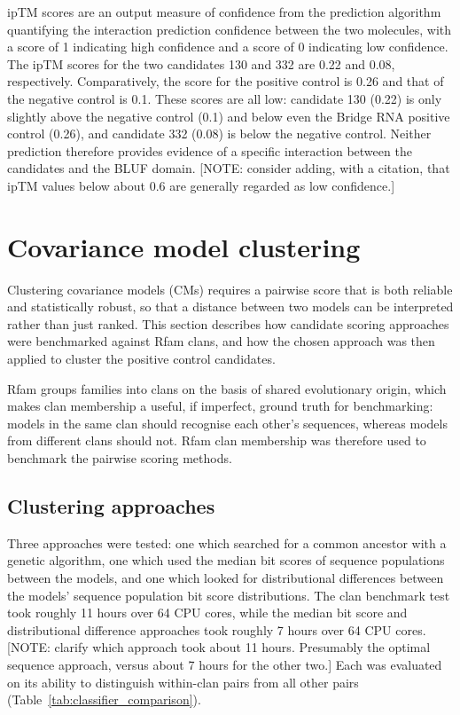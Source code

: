 \ac{ipTM} scores are an output measure of confidence from the prediction algorithm quantifying the interaction prediction confidence between the two molecules, with a score of 1 indicating high confidence and a score of 0 indicating low confidence.
The \ac{ipTM} scores for the two candidates 130 and 332 are 0.22 and 0.08, respectively.
Comparatively, the score for the positive control is 0.26 and that of the negative control is 0.1.
These scores are all low: candidate 130 (0.22) is only slightly above the negative control (0.1) and below even the Bridge RNA positive control (0.26), and candidate 332 (0.08) is below the negative control.
Neither prediction therefore provides evidence of a specific interaction between the candidates and the \ac{BLUF} domain.
[NOTE: consider adding, with a citation, that ipTM values below about 0.6 are generally regarded as low confidence.]

\section{Covariance model clustering}

Clustering covariance models (CMs) requires a pairwise score that is both reliable and statistically robust, so that a distance between two models can be interpreted rather than just ranked. 
This section describes how candidate scoring approaches were benchmarked against Rfam clans, and how the chosen approach was then applied to cluster the positive control candidates.

Rfam groups families into clans on the basis of shared evolutionary origin, which makes clan membership a useful, if imperfect, ground truth for benchmarking: models in the same clan should recognise each other's sequences, whereas models from different clans should not. 
Rfam clan membership was therefore used to benchmark the pairwise scoring methods.

\subsection{Clustering approaches}

Three approaches were tested: one which searched for a common ancestor with a genetic algorithm, one which used the median bit scores of sequence populations between the models, and one which looked for distributional differences between the models' sequence population bit score distributions. 
The clan benchmark test took roughly 11 hours over 64 \ac{CPU} cores, while the median bit score and distributional difference approaches took roughly 7 hours over 64 \ac{CPU} cores. [NOTE: clarify which approach took about 11 hours. Presumably the optimal sequence approach, versus about 7 hours for the other two.]
Each was evaluated on its ability to distinguish within-clan pairs from all other pairs (Table~\ref{tab:classifier_comparison}).

